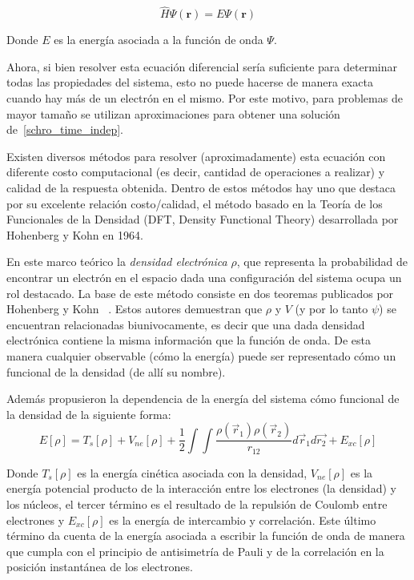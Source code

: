 \begin{equation}
    \label{schro_time_indep}
    \hat{H} \Psi(\mathbf{r}) = E \Psi(\mathbf{r})
\end{equation}

Donde $E$ es la energ\'ia asociada a la funci\'on de onda $\Psi$.

Ahora, si bien resolver esta ecuaci\'on diferencial ser\'ia suficiente para determinar todas las propiedades del sistema, esto no puede hacerse de
manera exacta cuando hay m\'as de un electr\'on en el mismo. Por este motivo, para problemas de mayor tama\~no se utilizan aproximaciones
para obtener una soluci\'on de~\ref{schro_time_indep}.

Existen diversos m\'etodos para resolver (aproximadamente) esta ecuaci\'on con diferente costo computacional (es decir, cantidad de operaciones a realizar)
y calidad de la respuesta obtenida. Dentro de estos m\'etodos hay uno que destaca por su excelente relaci\'on costo/calidad, el m\'etodo basado en la Teor\'ia de los Funcionales de la Densidad
(DFT, Density Functional Theory) desarrollada por Hohenberg y Kohn en 1964.

En este marco te\'orico la \textit{densidad electr\'onica} $\rho$, que representa la probabilidad de encontrar un electr\'on en
el espacio dada una configuraci\'on del sistema ocupa un rol destacado.
La base de este m\'etodo consiste en dos teoremas publicados por Hohenberg y Kohn ~\cite{HohenbergKohn}.
Estos autores demuestran que $\rho$ y $V$ (y por lo tanto $\psi$) se encuentran relacionadas biunivocamente,
es decir que una dada densidad electr\'onica contiene la misma informaci\'on que la funci\'on de onda.
De esta manera cualquier observable (c\'omo la energ\'ia) puede ser representado c\'omo un funcional de la densidad (de all\'i su nombre).

Adem\'as propusieron la dependencia de la energ\'ia del sistema c\'omo funcional de la densidad de la siguiente forma:
\begin{equation}
    \label{hohenberg_kohn_energy}
    E[\rho] = T_s[\rho] + V_{ne}[\rho] + \frac{1}{2} \int \int \frac{\rho(\vec{r}_1) \rho(\vec{r}_2)}{r_{12}} d\vec{r}_1 d\vec{r_2} + E_{xc}[\rho]
\end{equation}

Donde $T_s[\rho]$ es la energ\'ia cin\'etica asociada con la densidad, $V_{ne}[\rho]$ es la energ\'ia potencial producto de la interacci\'on entre los
electrones (la densidad) y los n\'ucleos, el tercer t\'ermino es el resultado de la repulsi\'on de Coulomb entre electrones y $E_{xc}[\rho]$ es la
energ\'ia de intercambio y correlaci\'on. Este \'ultimo t\'ermino da cuenta de la energ\'ia asociada a escribir la funci\'on de onda de manera que cumpla con el principio de antisimetr\'ia de Pauli y de la correlaci\'on
en la posici\'on instant\'anea de los electrones.

